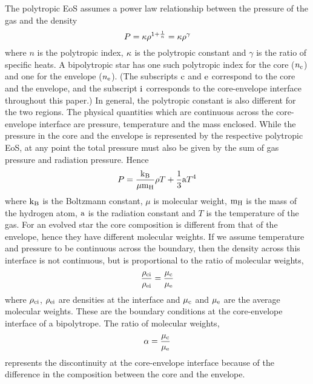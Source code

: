 \documentclass[a4paper,fleqn,usenatbib]{mnras}
\begin{document}
The polytropic EoS assumes a power law relationship between the pressure of the gas and the density
\begin{equation}
 P=\kappa\rho^{1+\frac{1}{n}}= {\rm \kappa} \rho^{\gamma}
\end{equation}
where $n$ is the polytropic index, ${\rm \kappa}$ is the polytropic constant and $\gamma$ is the ratio of specific heats.
A bipolytropic star has one such polytropic index for the core ($n_{\rm c}$) and one for the envelope ($n_{\rm e}$). 
(The subscripts ${\rm c}$ and ${\rm e}$ correspond to the core and the envelope, and the subscript ${\rm i}$ corresponds to the core-envelope interface throughout this paper.)
In general, the polytropic constant is also different for the two regions. 
The physical quantities which are continuous across the core-envelope interface are pressure, temperature and the mass enclosed. 
While the pressure in the core and the envelope is represented by the respective polytropic EoS, at any point the total pressure must also be given by the sum of gas pressure and radiation pressure. Hence
\begin{equation}
P= \frac{ {\rm k_B}}{\mu {\rm m_H}} \rho T+\frac{1}{3} {\rm a} T^4
\end{equation}
where ${\rm k_B}$ is the Boltzmann constant, $\mu$ is molecular weight, ${\rm m_H}$ is the mass of the hydrogen atom, ${\rm a}$ is the radiation constant and $T$ is the temperature of the gas.
For an evolved star the core composition is different from that of the envelope, hence they have different molecular weights. 
If we assume temperature and pressure to be continuous across the boundary, then the density across this interface is not continuous, but is proportional to the ratio of molecular weights, 
\begin{equation}
\frac{\rho_{\rm ci}}{\rho_{\rm ei}}=\frac{\mu_{\rm c}}{\mu_{\rm e}}
\end{equation}
where $\rho_{\rm ci}$, $\rho_{\rm ei}$ are densities at the interface and $\mu_{\rm c}$ and $\mu_{\rm e}$ are the average molecular weights. These are the boundary conditions at the core-envelope interface of a bipolytrope. 
The ratio of molecular weights, 
\begin{equation}
\alpha=\frac{\mu_{\rm c}}{\mu_{\rm e}}
\end{equation}
represents the discontinuity at the core-envelope interface because of the difference in the composition between the core and the envelope.
\end{document}
